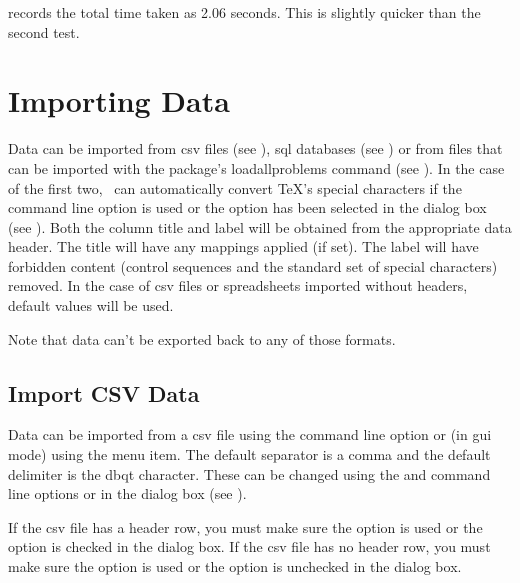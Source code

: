    records the total time taken as 2.06 seconds.
  This is slightly quicker than the second  test.


\chapter{Importing Data}\label{sec:import}

   Data can be imported from \gls{csv} files (see 
   ), \gls{sql} databases (see 
   ) or from files that can be imported with 
   the  package's \gls{loadallproblems} command
   (see ). In the case of the first
   two, \appname\ can automatically convert \TeX's special characters if the
    command line option is used or the
    option has been selected in the 
    dialog box (see ).
   Both the column title and label will be obtained from the appropriate data 
   header.  The title will have any mappings applied (if set). The label will 
   have forbidden content (control sequences and the standard set of special 
   characters) removed. In the case of \gls{csv} files or spreadsheets
   imported without headers, default values will be used.


   Note that data can't be exported back to any of those formats.


\section{Import CSV Data}\label{sec:importcsv}

   Data can be imported from a \gls{csv} file using
   the  command line option or (in \gls{gui} mode)
   using the  menu item. The default
   separator is a \gls{comma} and the default delimiter is the \gls{dbqt}
   character. These can be changed using the  and 
    command line options or in the 
    dialog box (see ).

   If the \gls{csv} file has a header row, you must make sure 
   the  option is used or the 
    option is checked in the
    dialog box.
   If the \gls{csv} file has no header row, you must make sure 
   the  option is used or the 
    option is unchecked in the
    dialog box.


